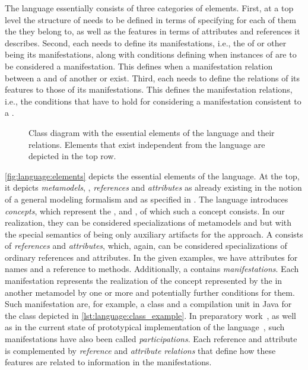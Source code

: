 The \commonalities language essentially consists of three categories of elements.
First, at a top level the structure of \commonalities needs to be defined in terms of specifying for each of them the \conceptmetamodels they belong to, as well as the features in terms of attributes and references it describes.
Second, each \commonality needs to define its manifestations, i.e., the \metaclasses of \concretemetamodels or other \conceptmetamodels being its manifestations, along with conditions defining when instances of \metaclasses are to be considered a manifestation.
This defines when a manifestation relation between a \commonality and \metaclasses of another \conceptmetamodel or \concretemetamodel exist.
Third, each \commonality needs to define the relations of its features to those of its manifestations.
This defines the manifestation relations, i.e., the conditions that have to hold for considering a manifestation consistent to a \commonality.

\begin{figure}
    \centering
    
    \caption[\commonalities language elements]{Class diagram with the essential elements of the \commonalities language and their relations. Elements that exist independent from the language are depicted in the top row.}
    \label{fig:language:elements}
\end{figure}

\autoref{fig:language:elements} depicts the essential elements of the \commonalities language.
At the top, it depicts \emph{metamodels}, \emph{\metaclasses}, \emph{references} and \emph{attributes} as already existing in the notion of a general modeling formalism and as specified in \concretemetamodels.
The language introduces \emph{concepts}, which represent the \conceptmetamodels, and \emph{\commonalities}, of which such a concept consists.
In our realization, they can be considered specializations of metamodels and \metaclasses but with the special semantics of being only auxiliary artifacts for the \commonalities approach.
A \commonality consists of \emph{\commonality references} and \emph{attributes}, which, again, can be considered specializations of ordinary references and attributes.
In the given examples, we have attributes for names and a reference to methods.
Additionally, a \commonality contains \emph{manifestations}.
Each manifestation represents the realization of the concept represented by the \commonality in another metamodel by one or more  \metaclasses and potentially further conditions for them.
Such manifestation are, for example, a class and a compilation unit in Java for the class \commonality depicted in \autoref{lst:language:class_example}.
In preparatory work~, as well as in the current state of prototypical implementation of the language~, such manifestations have also been called \emph{participations}.
Each \commonality reference and attribute is complemented by \emph{reference} and \emph{attribute relations} that define how these features are related to information in the manifestations.


